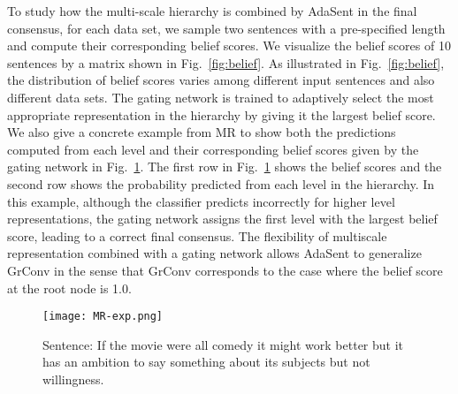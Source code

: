 \documentclass{article}
\theoremstyle{definition}
\begin{document}
To study how the multi-scale hierarchy is combined by AdaSent in the final consensus, for each data set, we sample two sentences with a pre-specified length and compute their corresponding belief scores. We visualize the belief scores of 10 sentences by a matrix shown in Fig.~\ref{fig:belief}. As illustrated in Fig.~\ref{fig:belief}, the distribution of belief scores varies among different input sentences and also different data sets. The gating network is trained to adaptively select the most appropriate representation in the hierarchy by giving it the largest belief score. We also give a concrete example from MR to show both the predictions computed from each level and their corresponding belief scores given by the gating network in Fig.~\ref{fig:MR-exp}. The first row in Fig.~\ref{fig:MR-exp} shows the belief scores  and the second row shows the probability  predicted from each level in the hierarchy. In this example, although the classifier predicts incorrectly for higher level representations, the gating network assigns the first level with the largest belief score, leading to a correct final consensus. The flexibility of multiscale representation combined with a gating network allows AdaSent to generalize GrConv in the sense that GrConv corresponds to the case where the belief score at the root node is 1.0.
\begin{figure}[htb]
\centering
	\texttt{[image: MR-exp.png]}
\caption{Sentence: If the movie were all comedy it might work better but it has an ambition to say something about its subjects but not willingness.}
\label{fig:MR-exp}
\end{figure}
\end{document}
